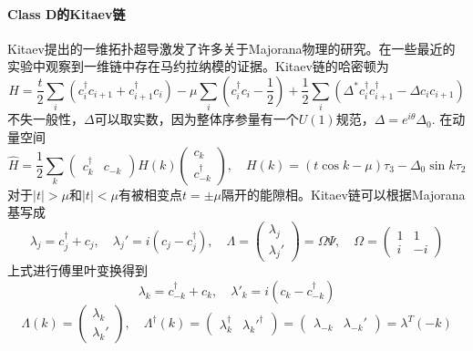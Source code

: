 \documentclass[a4paper]{article}
\numberwithin{equation}{subsection}
\begin{document}
\paragraph{Class D的Kitaev链}
Kitaev提出的一维拓扑超导激发了许多关于Majorana物理的研究。在一些最近的实验中观察到一维链中存在马约拉纳模的证据。Kitaev链的哈密顿为
\begin{equation}
    H=\frac{t}{2}\sum_{i}(c_i^\dagger c_{i+1}+c_{i+1}^\dagger c_i)-\mu\sum_{i}(c_i^\dagger c_i-\frac{1}{2})+\frac{1}{2}\sum_{i}(\Delta^*c_i^\dagger c_{i+1}^\dagger-\Delta c_ic_{i+1})
\end{equation}
不失一般性，$\Delta$可以取实数，因为整体序参量有一个$U(1)$规范，$\Delta=e^{i\theta}\Delta_0$. 在动量空间
\begin{equation}
    \hat{H}=\frac{1}{2}\sum_{k}\begin{pmatrix}
        c_k^\dagger&c_{-k}
    \end{pmatrix}H(k)\begin{pmatrix}
        c_k\\
        c_{-k}^\dagger
    \end{pmatrix},\quad H(k)=(t\cos k-\mu)\tau_3-\Delta_0\sin k\tau_2
\end{equation}
对于$|t|>\mu$和$|t|<\mu$有被相变点$t=\pm\mu$隔开的能隙相。Kitaev链可以根据Majorana基写成
\begin{equation}
    \lambda_j=c_j^\dagger+c_j,\quad \lambda_j'=i(c_j-c_j^\dagger),\quad\Lambda=\begin{pmatrix}
        \lambda_j\\
        \lambda_j'
    \end{pmatrix}=\Omega\Psi,\quad \Omega=\begin{pmatrix}
        1&1\\
        i&-i
    \end{pmatrix}
\end{equation}
上式进行傅里叶变换得到
\begin{equation}
    \lambda_k=c_{-k}^\dagger+c_k,\quad\lambda'_k=i(c_k-c_{-k}^\dagger)
\end{equation}
\begin{equation}
    \Lambda(k)=\begin{pmatrix}
        \lambda_k\\
        \lambda_k'
    \end{pmatrix},\quad\Lambda^\dagger(k)=\begin{pmatrix}
        \lambda_k^\dagger&\lambda_{k}'^\dagger
    \end{pmatrix}=\begin{pmatrix}
        \lambda_{-k}&\lambda_{-k}'
    \end{pmatrix}=\lambda^T(-k)
\end{equation}
\end{document}
